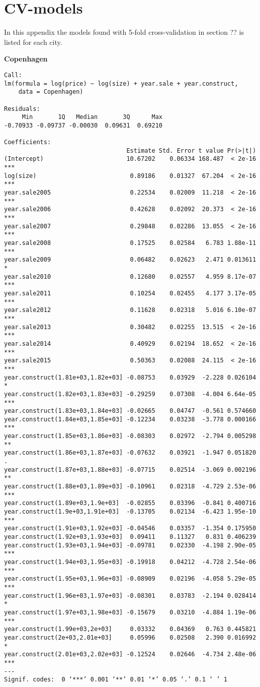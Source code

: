 \chapter{CV-models} \label{aap:cv}
In this appendix the models found with 5-fold cross-validation in section ?? is listed for each city.

\textbf{Copenhagen}
\begin{lstlisting}
Call:
lm(formula = log(price) ~ log(size) + year.sale + year.construct, 
    data = Copenhagen)

Residuals:
     Min       1Q   Median       3Q      Max 
-0.70933 -0.09737 -0.00030  0.09631  0.69210 

Coefficients:
                                  Estimate Std. Error t value Pr(>|t|)    
(Intercept)                       10.67202    0.06334 168.487  < 2e-16 ***
log(size)                          0.89186    0.01327  67.204  < 2e-16 ***
year.sale2005                      0.22534    0.02009  11.218  < 2e-16 ***
year.sale2006                      0.42628    0.02092  20.373  < 2e-16 ***
year.sale2007                      0.29848    0.02286  13.055  < 2e-16 ***
year.sale2008                      0.17525    0.02584   6.783 1.88e-11 ***
year.sale2009                      0.06482    0.02623   2.471 0.013611 *  
year.sale2010                      0.12680    0.02557   4.959 8.17e-07 ***
year.sale2011                      0.10254    0.02455   4.177 3.17e-05 ***
year.sale2012                      0.11628    0.02318   5.016 6.10e-07 ***
year.sale2013                      0.30482    0.02255  13.515  < 2e-16 ***
year.sale2014                      0.40929    0.02194  18.652  < 2e-16 ***
year.sale2015                      0.50363    0.02088  24.115  < 2e-16 ***
year.construct(1.81e+03,1.82e+03] -0.08753    0.03929  -2.228 0.026104 *  
year.construct(1.82e+03,1.83e+03] -0.29259    0.07308  -4.004 6.64e-05 ***
year.construct(1.83e+03,1.84e+03] -0.02665    0.04747  -0.561 0.574660    
year.construct(1.84e+03,1.85e+03] -0.12234    0.03238  -3.778 0.000166 ***
year.construct(1.85e+03,1.86e+03] -0.08303    0.02972  -2.794 0.005298 ** 
year.construct(1.86e+03,1.87e+03] -0.07632    0.03921  -1.947 0.051820 .  
year.construct(1.87e+03,1.88e+03] -0.07715    0.02514  -3.069 0.002196 ** 
year.construct(1.88e+03,1.89e+03] -0.10961    0.02318  -4.729 2.53e-06 ***
year.construct(1.89e+03,1.9e+03]  -0.02855    0.03396  -0.841 0.400716    
year.construct(1.9e+03,1.91e+03]  -0.13705    0.02134  -6.423 1.95e-10 ***
year.construct(1.91e+03,1.92e+03] -0.04546    0.03357  -1.354 0.175950    
year.construct(1.92e+03,1.93e+03]  0.09411    0.11327   0.831 0.406239    
year.construct(1.93e+03,1.94e+03] -0.09781    0.02330  -4.198 2.90e-05 ***
year.construct(1.94e+03,1.95e+03] -0.19918    0.04212  -4.728 2.54e-06 ***
year.construct(1.95e+03,1.96e+03] -0.08909    0.02196  -4.058 5.29e-05 ***
year.construct(1.96e+03,1.97e+03] -0.08301    0.03783  -2.194 0.028414 *  
year.construct(1.97e+03,1.98e+03] -0.15679    0.03210  -4.884 1.19e-06 ***
year.construct(1.99e+03,2e+03]     0.03332    0.04369   0.763 0.445821    
year.construct(2e+03,2.01e+03]     0.05996    0.02508   2.390 0.016992 *  
year.construct(2.01e+03,2.02e+03] -0.12524    0.02646  -4.734 2.48e-06 ***
---
Signif. codes:  0 ‘***’ 0.001 ‘**’ 0.01 ‘*’ 0.05 ‘.’ 0.1 ‘ ’ 1


\end{lstlisting}
